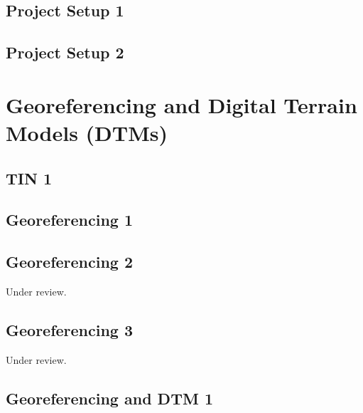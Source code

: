 \documentclass{scrartcl}
\begin{document}
\subsection{Project Setup 1}
\label{sec:project_setup_1}
\clearpage

\subsection{Project Setup 2}
\label{sec:project_setup_2}
\clearpage

\section{Georeferencing and Digital Terrain Models (DTMs)}
\label{sec:georeferencing_and_dtms}

\subsection{TIN 1}
\label{sec:tin_1}
\clearpage

\subsection{Georeferencing 1}
\label{sec:georeferencing_1}
\clearpage

\subsection{Georeferencing 2} %
\label{sec:georeferencing_3}
Under review.%
\clearpage

\subsection{Georeferencing 3} %
\label{sec:georeferencing_4}
Under review.%
\clearpage

\subsection{Georeferencing and DTM 1}
\label{sec:georef_tin_1}
\clearpage
\end{document}
